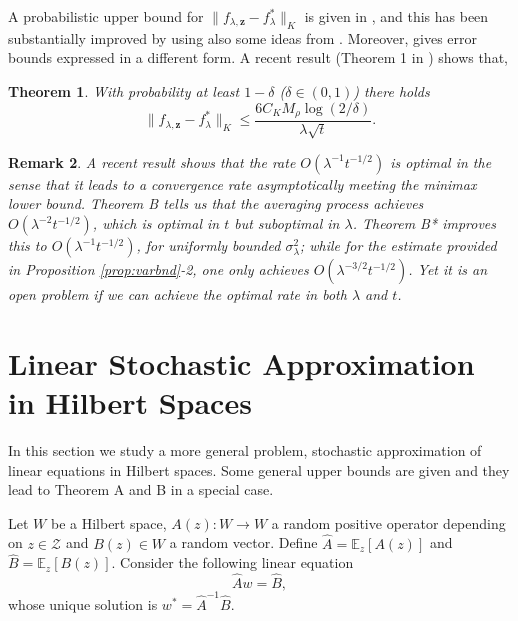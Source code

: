 \documentclass[twoside,twocolumn,journal]{IEEEtran}
\newtheorem{thm}{Theorem}[section]
\newtheorem{rem}[thm]{Remark}
\def\E{{\mathbb E}}        %
\def\ZZ{{\mathscr Z}}
\def\z{{\mathbf z}}
\begin{document}
A probabilistic upper bound for
$\|f_{\lambda,\z}-f^\ast_\lambda\|_K$ is given in
\cite{CucSma02b}, and this has been substantially improved by
\cite{DevCapRos04} using also some ideas from \cite{BouEli02}.
Moreover, \cite{Zhang03} gives error bounds expressed in a different form.
A recent result (Theorem 1 in \cite{SmaZho-ShannonIII}) shows that,

\medskip

\begin{thm} With probability at least $1-\delta$ ($\delta\in (0,1)$) there holds
\[ \| f_{\lambda,\z} - f^\ast_\lambda \|_K \leq \frac{6C_K M_\rho\log(2/\delta)}{\lambda \sqrt{t}}.\]
\end{thm}

\medskip

\begin{rem}
A recent result \cite{CapDev05} shows that the rate $O(\lambda^{-1} t^{-1/2})$ is optimal in the sense that it leads to a
convergence rate asymptotically meeting the minimax lower bound.
Theorem B tells us that the averaging process achieves $O(\lambda^{-2} t^{-1/2})$,
which is optimal in $t$ but suboptimal in $\lambda$. Theorem B* improves
this to $O(\lambda^{-1} t^{-1/2})$, for uniformly bounded $\sigma^2_\lambda$; while for the estimate
provided in Proposition \ref{prop:varbnd}-2, one only achieves $O(\lambda^{-3/2} t^{-1/2})$. Yet it is an open
problem if we can achieve the optimal rate in both $\lambda$ and $t$.
\end{rem}


\section{Linear Stochastic Approximation in Hilbert Spaces}


In this section we study a more general problem,
stochastic approximation of linear equations in Hilbert
spaces. Some general upper bounds
are given and they lead to Theorem A and B in a special case.

Let $W$ be a Hilbert space, $A(z):W\to W$ a random
positive operator depending on $z\in \ZZ$ and $B(z)\in W$ a random
vector. Define $\hat{A}=\E_z[A(z)]$ and $\hat{B}=\E_z[B(z)]$.
Consider the following linear equation
\begin{equation} \label{eq:basiclin}
\hat{A}w = \hat{B},
\end{equation}
whose unique solution is $w^\ast= \hat{A}^{-1} \hat{B}$.
\end{document}
